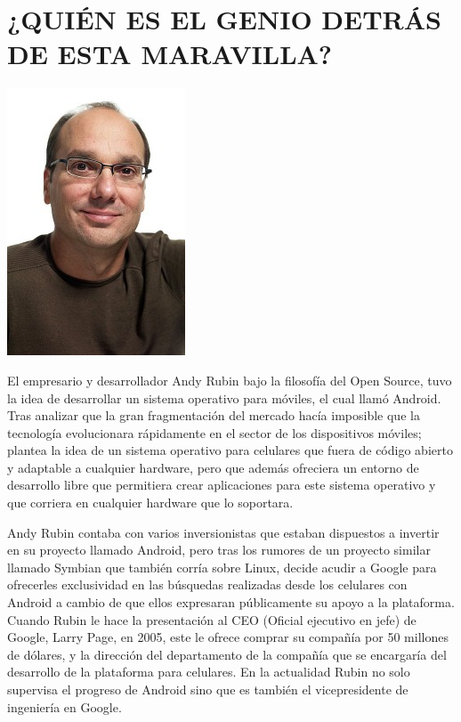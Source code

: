 \section*{¿QUIÉN ES EL GENIO DETRÁS DE ESTA MARAVILLA?}

\includegraphics[scale=0.5]{img/cp05/img0502.png}

El empresario y desarrollador Andy Rubin bajo la filosofía del Open Source, tuvo la idea de desarrollar un sistema operativo para móviles, el cual llamó Android. Tras analizar 
que la gran fragmentación del mercado hacía imposible que la tecnología evolucionara rápidamente en el sector de los dispositivos móviles; plantea la idea de un sistema operativo 
para celulares que fuera de código abierto y adaptable a cualquier hardware, pero que además ofreciera un entorno de desarrollo libre que permitiera crear aplicaciones para este 
sistema operativo y que corriera en cualquier hardware que lo soportara.
 
Andy Rubin contaba con varios inversionistas que estaban dispuestos a invertir en su proyecto llamado Android, pero tras los rumores de un proyecto similar llamado Symbian que 
también corría sobre Linux, decide acudir a Google para ofrecerles exclusividad en las búsquedas realizadas desde los celulares con Android a cambio de que ellos expresaran 
públicamente su apoyo a la plataforma. Cuando Rubin le hace la presentación al CEO (Oficial ejecutivo en jefe) de Google, Larry Page, en 2005, este le ofrece comprar su compañía 
por 50 millones de dólares, y la dirección del departamento de la compañía que se encargaría del desarrollo de la plataforma para celulares. En la actualidad Rubin no solo 
supervisa el progreso de Android sino que es también el vicepresidente de ingeniería en Google.


